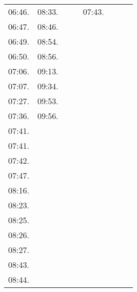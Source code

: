 \documentclass{mcmthesis}
\begin{document}
\begin{appendices}
\begin{table}[htbp]
\begin{tabular}{m{1.3cm}<{\centering}m{1.3cm}<{\centering}m{1.3cm}<{\centering}m{1.3cm}<{\centering}m{1.3cm}<{\centering}m{1.3cm}<{\centering}m{1.3cm}<{\centering}m{1.3cm}<{\centering}}
				06:46.&	08:33.&		&		&	07:43.&&&\\		
				06:47.&	08:46.&&&&&&\\						
				06:49.&	08:54.&&&&&&\\						
				06:50.&	08:56.&&&&&&\\						
				07:06.&	09:13.&&&&&&\\						
				07:07.&	09:34.&&&&&&\\						
				07:27.&	09:53.&&&&&&\\						
				07:36.&	09:56.&&&&&&\\	
				07:41.&&&&&&&\\							
				07:41.&&&&&&&\\						
				07:42.&&&&&&&\\							
				07:47.&&&&&&&\\							
				08:16.&&&&&&&\\							
				08:23.&&&&&&&\\							
				08:25.&&&&&&&\\							
				08:26.&&&&&&&\\							
				08:27.&&&&&&&\\							
				08:43.&&&&&&&\\							
				08:44.&&&&&&&\\							
				\bottomrule
			\end{tabular}
		\end{table}
		

\end{appendices}
\end{document}
